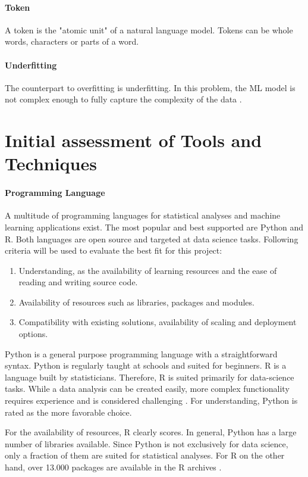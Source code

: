 	\paragraph{Token} A token is the "atomic unit" \cite{MLGlossary} of a natural language model. Tokens can be whole words, characters or parts of a word.
	\paragraph{Underfitting} The counterpart to overfitting is underfitting. In this problem, the \ac{ML} model is not complex enough to fully capture the complexity of the data \cite{MLGlossary}.




\section{Initial assessment of Tools and Techniques}

\paragraph{Programming Language}
A multitude of programming languages for statistical analyses and machine learning applications exist. The most popular and best supported are Python and R. Both languages are open source and targeted at data science tasks.
Following criteria will be used to evaluate the best fit for this project:
\begin{enumerate}
\item Understanding, as the availability of learning resources and the ease of reading and writing source code.
\item Availability of resources such as libraries, packages and modules.
\item Compatibility with existing solutions, availability of scaling and deployment options.
\end{enumerate}

Python is a general purpose programming language with a straightforward syntax. Python is regularly taught at schools and suited for beginners. R is a language built by statisticians. Therefore, R is suited primarily for data-science tasks. While a data analysis can be created easily, more complex functionality requires experience and is considered challenging \cite{pythonVsR}. For understanding, Python is rated as the more favorable choice.

For the availability of resources, R clearly scores. In general, Python has a large number of libraries available. Since Python is not exclusively for data science, only a fraction of them are suited for statistical analyses. For R on the other hand, over 13.000 packages are available in the R archives \cite{pythonVsR}.


